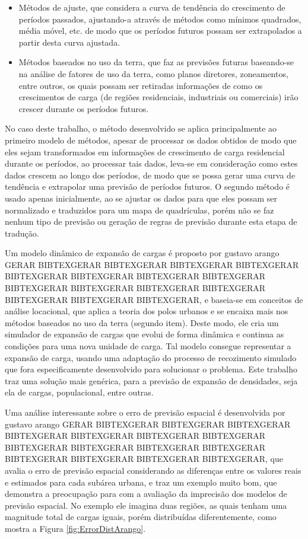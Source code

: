 \begin{itemize}
\item Métodos de ajuste, que considera a curva de tendência do crescimento de períodos passados, ajustando-a através de métodos como mínimos quadrados, média móvel, etc. de modo que os períodos futuros possam ser extrapolados a partir desta curva ajustada.
\item Métodos baseados no uso da terra, que faz as previsões futuras baseando-se na análise de fatores de uso da terra, como planos diretores, zoneamentos, entre outros, os quais possam ser retiradas informações de como os crescimentos de carga (de regiões residenciais, industriais ou comerciais) irão crescer durante os períodos futuros.
\end{itemize}

No caso deste trabalho, o método desenvolvido se aplica principalmente ao primeiro modelo de métodos, apesar de processar os dados obtidos de modo que eles sejam transformados em informações de crescimento de carga residencial durante os períodos, ao processar tais dados, leva-se em consideração como estes dados crescem ao longo dos períodos, de modo que se possa gerar uma curva de tendência e extrapolar uma previsão de períodos futuros. O segundo método é usado apenas inicialmente, ao se ajustar os dados para que eles possam ser normalizado e traduzidos para um mapa de quadrículas, porém não se faz nenhum tipo de previsão ou geração de regras de previsão durante esta etapa de tradução.

Um modelo dinâmico de expansão de cargas é proposto por gustavo arango GERAR BIBTEXGERAR BIBTEXGERAR BIBTEXGERAR BIBTEXGERAR BIBTEXGERAR BIBTEXGERAR BIBTEXGERAR BIBTEXGERAR BIBTEXGERAR BIBTEXGERAR BIBTEXGERAR BIBTEXGERAR BIBTEXGERAR BIBTEXGERAR BIBTEXGERAR, e baseia-se em conceitos de análise locacional, que aplica a teoria dos polos urbanos e se encaixa mais nos métodos baseados no uso da terra (segundo item). Deste modo, ele cria um simulador de expansão de cargas que evolui de forma dinâmica e continua as condições para uma nova unidade de carga. Tal modelo consegue representar a expansão de carga, usando uma adaptação do processo de recozimento simulado que fora especificamente desenvolvido para solucionar o problema. Este trabalho traz uma solução mais genérica, para a previsão de expansão de densidades, seja ela de cargas, populacional, entre outras.

Uma análise interessante sobre o erro de previsão espacial é desenvolvida por gustavo arango GERAR BIBTEXGERAR BIBTEXGERAR BIBTEXGERAR BIBTEXGERAR BIBTEXGERAR BIBTEXGERAR BIBTEXGERAR BIBTEXGERAR BIBTEXGERAR BIBTEXGERAR BIBTEXGERAR BIBTEXGERAR BIBTEXGERAR BIBTEXGERAR BIBTEXGERAR, que avalia o erro de previsão espacial considerando as diferenças entre os valores reais e estimados para cada subárea urbana, e traz um exemplo muito bom, que demonstra a preocupação para com a avaliação da imprecisão dos modelos de previsão espacial. No exemplo ele imagina duas regiões, as quais tenham uma magnitude total de cargas iguais, porém distribuídas diferentemente, como mostra a Figura \ref{fig:ErrorDistArango}.

